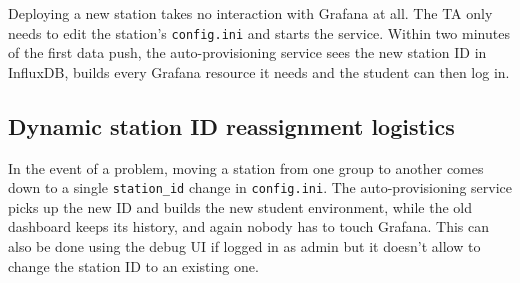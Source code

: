 Deploying a new station takes no interaction with Grafana at all. The TA only needs to edit the station's \texttt{config.ini} and starts the service. Within two minutes of the first data push, the auto-provisioning service sees the new station ID in InfluxDB, builds every Grafana resource it needs and the student can then log in.

\subsection{Dynamic station ID reassignment logistics}

In the event of a problem, moving a station from one group to another comes down to a single \texttt{station\_id} change in \texttt{config.ini}. The auto-provisioning service picks up the new ID and builds the new student environment, while the old dashboard keeps its history, and again nobody has to touch Grafana. This can also be done using the debug UI if logged in as admin but it doesn't allow to change the station ID to an existing one.


